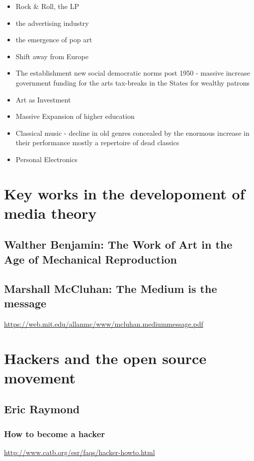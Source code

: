 \documentclass[11pt]{article}
\begin{document}
\begin{itemize}
\item Rock \& Roll, the LP
\item the advertising industry
\item the emergence of pop art
\item Shift away from Europe
\item The establishment new social democratic norms post 1950 - massive increase government funding for the arts tax-breaks in the States for wealthy patrons
\item Art as Investment
\item Massive Expansion of higher education
\item Classical music - decline in old genres concealed by the enormous increase in their performance mostly a repertoire of dead classics
\item Personal Electronics
\end{itemize}


\section{Key works in the developoment of media theory}
\label{sec:org36ec788}
\subsection{Walther Benjamin: The Work of Art in the Age of Mechanical Reproduction}
\label{sec:org54b25d1}

\subsection{Marshall McCluhan: The Medium is the message}
\label{sec:orge02661b}
\url{https://web.mit.edu/allanmc/www/mcluhan.mediummessage.pdf}


\section{Hackers and the open source movement}
\label{sec:orge0a82cb}

\subsection{Eric Raymond}
\label{sec:org5e8997f}
\subsubsection{How to become a hacker}
\label{sec:org2ba5156}
\url{http://www.catb.org/esr/faqs/hacker-howto.html}
\end{document}
